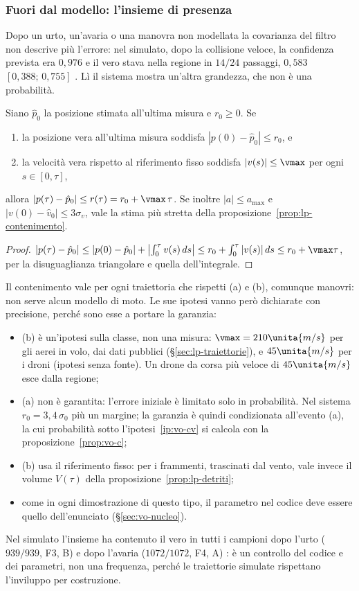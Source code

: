 \subsubsection{Fuori dal modello: l'insieme di presenza}\label{sec:vo-presenza}

Dopo un urto, un'avaria o una manovra non modellata la covarianza del filtro non descrive più l'errore: nel simulato, dopo la collisione veloce, la confidenza prevista era $0{,}976$ e il vero stava nella regione in $14/24$ passaggi, $0{,}583$ $[0{,}388;\,0{,}755]$ . Lì il sistema mostra un'altra grandezza, che non è una probabilità.

\begin{proposizione}\label{prop:vo-presenza}
Siano $\hat p_0$ la posizione stimata all'ultima misura e $r_0\ge0$. Se
\begin{enumerate}[label=(\alph*)]
\item la posizione vera all'ultima misura soddisfa $|p(0)-\hat p_0|\le r_0$, e
\item la velocità vera rispetto al riferimento fisso soddisfa $|v(s)|\le\vmax$ per ogni $s\in[0,\tau]$,
\end{enumerate}
allora $|p(\tau)-\hat p_0|\le r(\tau)=r_0+\vmax\,\tau$. Se inoltre $|a|\le a_{\max}$ e $|v(0)-\hat v_0|\le3\sigma_v$, vale la stima più stretta della proposizione~\ref{prop:lp-contenimento}.
\end{proposizione}
\begin{proof}
$|p(\tau)-\hat p_0|\le|p(0)-\hat p_0|+\bigl|\int_0^\tau v(s)\,ds\bigr|\le r_0+\int_0^\tau|v(s)|\,ds\le r_0+\vmax\tau$, per la disuguaglianza triangolare e quella dell'integrale.
\end{proof}
Il contenimento vale per ogni traiettoria che rispetti (a) e (b), comunque manovri: non serve alcun modello di moto. Le sue ipotesi vanno però dichiarate con precisione, perché sono esse a portare la garanzia:
\begin{itemize}
\item (b) è un'ipotesi sulla classe, non una misura: $\vmax=210\unita{m/s}$ per gli aerei in volo, dai dati pubblici (\S\ref{sec:lp-traiettorie}), e $45\unita{m/s}$ per i droni (ipotesi senza fonte). Un drone da corsa più veloce di $45\unita{m/s}$ esce dalla regione;
\item (a) non è garantita: l'errore iniziale è limitato solo in probabilità. Nel sistema $r_0=3{,}4\,\sigma_0$ più un margine; la garanzia è quindi condizionata all'evento (a), la cui probabilità sotto l'ipotesi~\ref{ip:vo-cv} si calcola con la proposizione~\ref{prop:vo-c};
\item (b) usa il riferimento fisso: per i frammenti, trascinati dal vento, vale invece il volume $V(\tau)$ della proposizione~\ref{prop:lp-detriti};
\item come in ogni dimostrazione di questo tipo, il parametro nel codice deve essere quello dell'enunciato (\S\ref{sec:vo-nucleo}).
\end{itemize}
Nel simulato l'insieme ha contenuto il vero in tutti i campioni dopo l'urto ($939/939$, F3, B) e dopo l'avaria ($1072/1072$, F4, A) : è un controllo del codice e dei parametri, non una frequenza, perché le traiettorie simulate rispettano l'inviluppo per costruzione.

